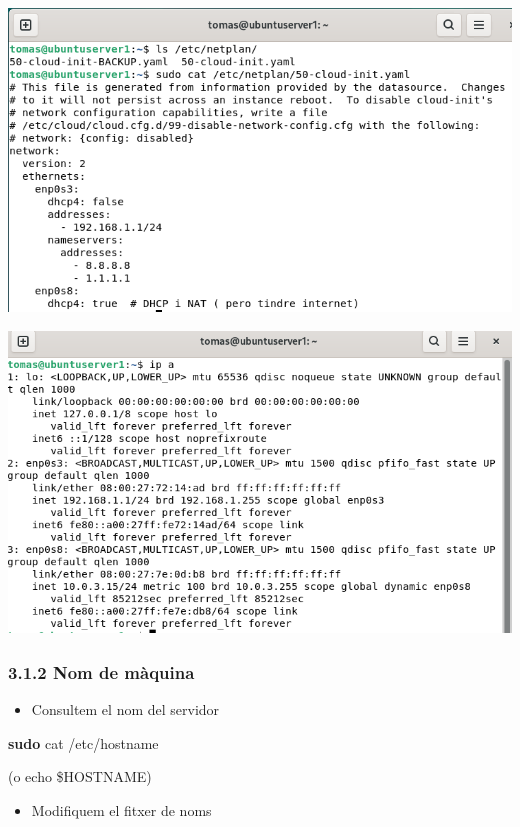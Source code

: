 \documentclass[
  12 pt,
  a4paper,
]{article}
\newenvironment{Shaded}{\begin{snugshade}}{\end{snugshade}}
\newcommand{\FunctionTok}[1]{\textcolor[rgb]{0.13,0.29,0.53}{\textbf{#1}}}
\newcommand{\NormalTok}[1]{#1}
\providecommand{\tightlist}{%
  \setlength{\itemsep}{0pt}\setlength{\parskip}{0pt}}
\begin{document}
\includegraphics{png/netplan.png}

\includegraphics{png/ipa.png}

\subsubsection{3.1.2 Nom de màquina}\label{nom-de-muxe0quina}

\begin{itemize}
\tightlist
\item
  Consultem el nom del servidor
\end{itemize}

\begin{Shaded}
\begin{Highlighting}[]
\FunctionTok{sudo}\NormalTok{ cat /etc/hostname}
\end{Highlighting}
\end{Shaded}

(o echo \$HOSTNAME)

\begin{itemize}
\tightlist
\item
  Modifiquem el fitxer de noms
\end{itemize}
\end{document}
